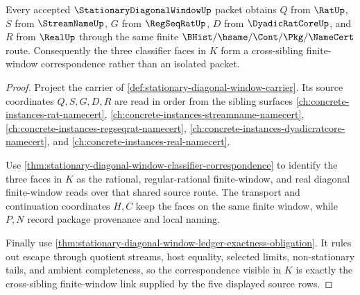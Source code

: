 \begin{theorem}
\label{thm:stationary-diagonal-window-sibling-lattice-link}
Every accepted $\StationaryDiagonalWindowUp$ packet obtains $Q$ from $\RatUp$, $S$ from $\StreamNameUp$, $G$ from $\RegSeqRatUp$, $D$ from $\DyadicRatCoreUp$, and $R$ from $\RealUp$ through the same finite $\BHist/\hsame/\Cont/\Pkg/\NameCert$ route. Consequently the three classifier faces in $K$ form a cross-sibling finite-window correspondence rather than an isolated packet.
\end{theorem}
\begin{proof}
Project the carrier of \autoref{def:stationary-diagonal-window-carrier}. Its source coordinates $Q,S,G,D,R$ are read in order from the sibling surfaces \autoref{ch:concrete-instances-rat-namecert}, \autoref{ch:concrete-instances-streamname-namecert}, \autoref{ch:concrete-instances-regseqrat-namecert}, \autoref{ch:concrete-instances-dyadicratcore-namecert}, and \autoref{ch:concrete-instances-real-namecert}.

Use \autoref{thm:stationary-diagonal-window-classifier-correspondence} to identify the three faces in $K$ as the rational, regular-rational finite-window, and real diagonal finite-window reads over that shared source route. The transport and continuation coordinates $H,C$ keep the faces on the same finite window, while $P,N$ record package provenance and local naming.

Finally use \autoref{thm:stationary-diagonal-window-ledger-exactness-obligation}. It rules out escape through quotient streams, host equality, selected limits, non-stationary tails, and ambient completeness, so the correspondence visible in $K$ is exactly the cross-sibling finite-window link supplied by the five displayed source rows.
\end{proof}


